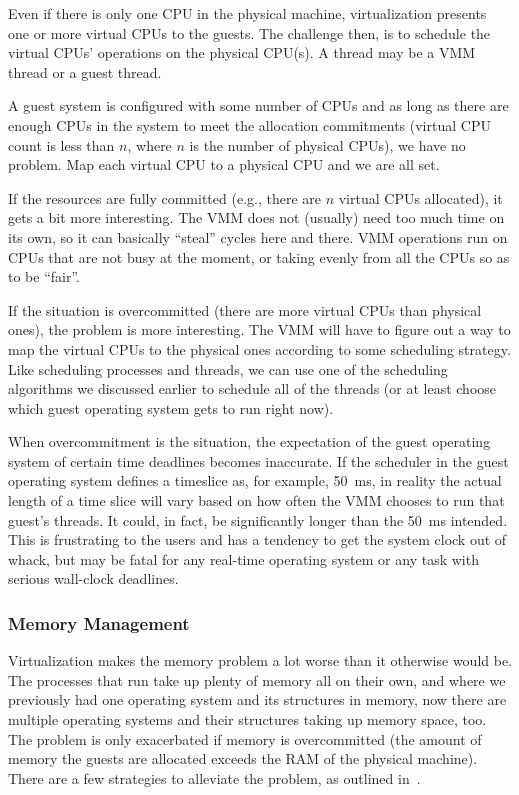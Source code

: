 Even if there is only one CPU in the physical machine, virtualization presents one or more virtual CPUs to the guests. The challenge then, is to schedule the virtual CPUs' operations on the physical CPU(s). A thread may be a VMM thread or a guest thread.

A guest system is configured with some number of CPUs and as long as there are enough CPUs in the system to meet the allocation commitments (virtual CPU count is less than $n$, where $n$ is the number of physical CPUs), we have no problem. Map each virtual CPU to a physical CPU and we are all set. 

If the resources are fully committed (e.g., there are $n$ virtual CPUs allocated), it gets a bit more interesting. The VMM does not (usually) need too much time on its own, so it can basically ``steal'' cycles here and there. VMM operations run on CPUs that are not busy at the moment, or taking evenly from all the CPUs so as to be ``fair''. 

If the situation is overcommitted (there are more virtual CPUs than physical ones), the problem is more interesting. The VMM will have to figure out a way to map the virtual CPUs to the physical ones according to some scheduling strategy. Like scheduling processes and threads, we can use one of the scheduling algorithms we discussed earlier to schedule all of the threads (or at least choose which guest operating system gets to run right now).

When overcommitment is the situation, the expectation of the guest operating system of certain time deadlines becomes inaccurate. If the scheduler in the guest operating system defines a timeslice as, for example, 50~ms, in reality the actual length of a time slice will vary based on how often the VMM chooses to run that guest's threads. It could, in fact, be significantly longer than the 50~ms intended. This is frustrating to the users and has a tendency to get the system clock out of whack, but may be fatal for any real-time operating system or any task with serious wall-clock deadlines.

\subsubsection*{Memory Management}

Virtualization makes the memory problem a lot worse than it otherwise would be. The processes that run take up plenty of memory all on their own, and where we previously had one operating system and its structures in memory, now there are multiple operating systems and their structures taking up memory space, too. The problem is only exacerbated if memory is overcommitted (the amount of memory the guests are allocated exceeds the RAM of the physical machine). There are a few strategies to alleviate the problem, as outlined in~\cite{osc}.

